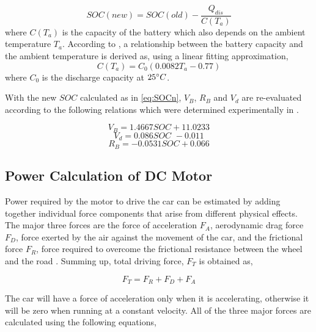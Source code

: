 \documentclass[journal]{IEEEtran/IEEEtran}
\begin{document}
	\begin{equation}
	\label{eq:SOCn}
	SOC\left(new\right) = SOC\left(old\right)-\frac{Q_{dis}}{C(T_a)}
	\end{equation}	
	where $C(T_a)$ is the capacity of the battery which also depends on the ambient temperature $T_a$. According to \cite{temp_cap}, a relationship between the battery capacity and the ambient temperature is derived as, using a linear fitting approximation,
	\begin{equation}
	\label{eq:temp_cap}
	C(T_a) = C_0(0.0082T_a-0.77)
	\end{equation}
	where $C_0$ is the discharge capacity at $25\degree C$.
	
	With the new $\mathit{SOC}$ calculated as in \eqref{eq:SOCn},  $V_B$, $R_B$ and $V_d$ are re-evaluated according to the following relations which were determined experimentally in \cite{sadia}.
	
	\begin{equation}
	V_B=1.4667\textit{SOC}+11.0233
	\end{equation}
	\begin{equation}
	V_d=0.086 \textit{SOC } - 0.011
	\end{equation}
	\begin{equation}
	R_B= -0.0531\textit{SOC} + 0.066
	\end{equation}
	
	
	\subsection{Power Calculation of DC Motor}
	Power required by the motor to drive the car can be estimated by adding together individual force components that arise from different physical effects. The major three forces are the force of acceleration $F_A$, aerodynamic drag force $F_D$, force exerted by the air against the movement of the car, and the frictional force $F_R$, force required to overcome the frictional resistance between the wheel and the road \cite{leitman}. Summing up, total driving force, $F_T$ is obtained as,
	
	\begin{equation}
	\label{eq:FT}
	F_T = F_{R}+F_{D}+F_{A}
	\end{equation}
	
	The car will have a force of acceleration only when it is accelerating, otherwise it will be zero when running at a constant velocity. All of the three major forces are calculated using the following equations,
	
\end{document}
